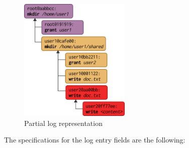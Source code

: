 \documentclass{sig-alternate}
\begin{document}



\begin{figure}[htp]
\centering
\includegraphics[width=150pt]{imgs/log.png}
\caption{Partial log representation}
\label{fig:log}
\end{figure}

The specifications for the log entry fields are the following:
\end{document}
